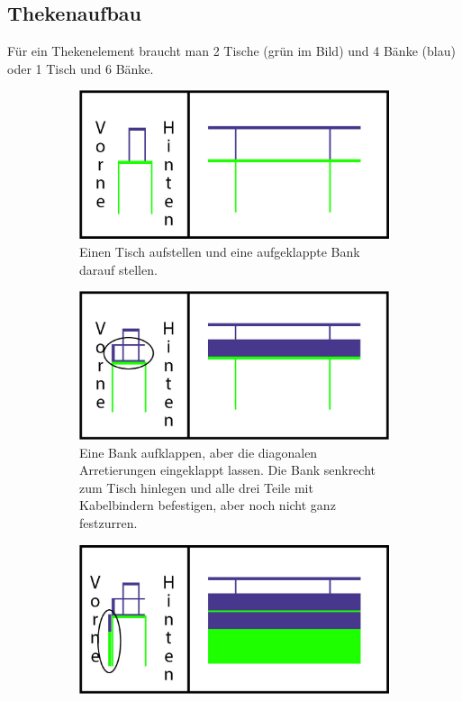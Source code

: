 \subsection{Thekenaufbau}
Für ein Thekenelement braucht man 2 Tische (grün im Bild) und 4 Bänke (blau) oder 1 Tisch und 6 Bänke.
\begin{figure}[h]
  \centering
  \begin{subfigure}[t]{0.45\textwidth}
    \includegraphics[width=\textwidth]{2d_1.png}
    \caption{Einen Tisch aufstellen und eine aufgeklappte Bank darauf stellen.}
  \end{subfigure}
  \hfill
  \begin{subfigure}[t]{0.45\textwidth}
    \includegraphics[width=\textwidth]{2d_2.png}
    \caption{Eine Bank aufklappen, aber die diagonalen Arretierungen eingeklappt lassen. Die Bank senkrecht zum Tisch hinlegen und alle drei Teile mit Kabelbindern befestigen, aber noch nicht ganz festzurren.}
  \end{subfigure}
  \centering
  \begin{subfigure}[t]{0.45\textwidth}
    \includegraphics[width=\textwidth]{2d_3.png}

\end{subfigure}
\end{figure}
